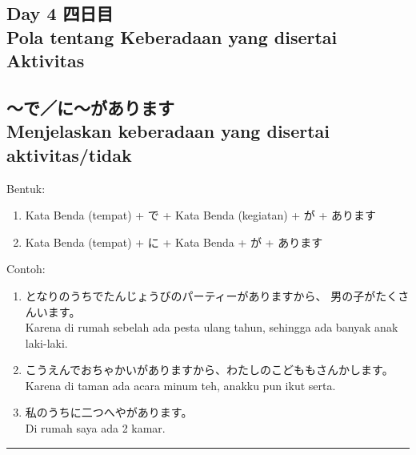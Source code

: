 \begin{flushright}
    \section*{\Large{Day 4 四日目 \\
    Pola tentang Keberadaan yang disertai Aktivitas}}
\end{flushright}

\subsection*{
    ～で／に～があります \\ 
    Menjelaskan keberadaan yang disertai aktivitas/tidak
}
Bentuk:
\begin{enumerate}
    \item Kata Benda (tempat) + で + Kata Benda (kegiatan) + が + あります
    \item Kata Benda (tempat) + に + Kata Benda + が + あります
\end{enumerate}
Contoh: 
\begin{enumerate}
    \item となりのうちでたんじょうびのパーティーがありますから、
    男の子がたくさんいます。
    \\ Karena di rumah sebelah ada pesta ulang tahun, sehingga ada banyak anak 
    laki-laki.
    \item こうえんでおちゃかいがありますから、わたしのこどももさんかします。
    \\ Karena di taman ada acara minum teh, anakku pun ikut serta.
    \item 私のうちに二つへやがあります。
    \\ Di rumah saya ada 2 kamar.
\end{enumerate}

\vspace{0.2cm}\hrule height 1pt\vspace{0.2cm}


